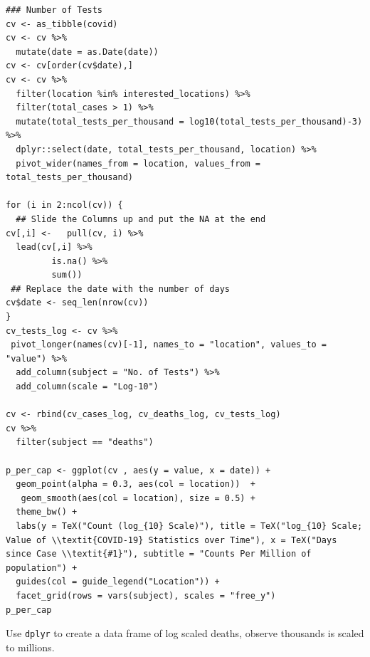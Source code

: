 \documentclass[11pt]{article}
\begin{document}
\begin{listing}[htbp]
\begin{verbatim}
### Number of Tests
cv <- as_tibble(covid)
cv <- cv %>%
  mutate(date = as.Date(date))
cv <- cv[order(cv$date),]
cv <- cv %>%
  filter(location %in% interested_locations) %>%
  filter(total_cases > 1) %>%
  mutate(total_tests_per_thousand = log10(total_tests_per_thousand)-3) %>%
  dplyr::select(date, total_tests_per_thousand, location) %>%
  pivot_wider(names_from = location, values_from = total_tests_per_thousand)

for (i in 2:ncol(cv)) {
  ## Slide the Columns up and put the NA at the end
cv[,i] <-   pull(cv, i) %>%
  lead(cv[,i] %>%
         is.na() %>%
         sum())
 ## Replace the date with the number of days
cv$date <- seq_len(nrow(cv))
}
cv_tests_log <- cv %>%
 pivot_longer(names(cv)[-1], names_to = "location", values_to = "value") %>%
  add_column(subject = "No. of Tests") %>%
  add_column(scale = "Log-10")

cv <- rbind(cv_cases_log, cv_deaths_log, cv_tests_log)
cv %>%
  filter(subject == "deaths")

p_per_cap <- ggplot(cv , aes(y = value, x = date)) +
  geom_point(alpha = 0.3, aes(col = location))  +
   geom_smooth(aes(col = location), size = 0.5) +
  theme_bw() +
  labs(y = TeX("Count (log_{10} Scale)"), title = TeX("log_{10} Scale; Value of \\textit{COVID-19} Statistics over Time"), x = TeX("Days since Case \\textit{#1}"), subtitle = "Counts Per Million of population") +
  guides(col = guide_legend("Location")) +
  facet_grid(rows = vars(subject), scales = "free_y")
p_per_cap
\end{verbatim}
\caption{\label{orgbed3112}Use \texttt{dplyr} to create a data frame of log scaled deaths, observe thousands is scaled to millions.}
\end{listing}
\end{document}
